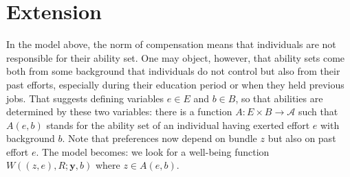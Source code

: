 \documentclass[12pt,thmsb]{article}
\begin{document}
\section{Extension}

In the model above, the norm of compensation means that individuals are not responsible for their ability set. One may object, however, that ability sets come both from some background that individuals do not control but also from their past efforts, especially during their education period or when they held previous jobs. That suggests defining variables $e\in E$ and $b\in B$, so that abilities are determined by these two variables: there is a function $A:E\times B\rightarrow \mathcal{A}$ such that $A(e,b)$ stands for the ability set of an individual having exerted effort $e$ with background $b$. Note that preferences now depend on bundle $z$ but also on past effort $e$. The model becomes: we look for a well-being function $W((z,e),R;\mathbf{y},b)$ where $z\in A(e,b)$.


\nocite{*}
\printbibliography
\end{document}
